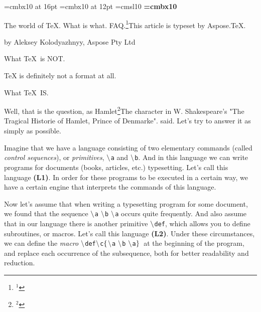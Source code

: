 \parskip=0pt
\def\afterpar{\vskip 15pt}
\def\beforepar{\vskip 5pt}
\font\bfsxt=cmbx10 at 16pt
\font\bftw=cmbx10 at 12pt
\font\slten=cmsl10
\font\bf=cmbx10
\def\fn#1#2{\footnote{\rm$^{#1}$}{#2}}
\def\header#1#2{{\centerline{\bfsxt #1}\vskip 10pt\centerline{by \slten #2}}}
\def\section#1{\afterpar{\bftw #1}\beforepar}
\def\cs#1{{$\tt \backslash$\tt #1}}
\def\ref#1{{\bf (#1)}}
\def\leftcb{$\tt\{$}
\def\rightcb{$\tt\}$}

\header{The world of \TeX. What is what. FAQ.\fn{1}{\rm This article is typeset by Aspose.TeX.}}{Aleksey Kolodyazhnyy, Aspose Pty Ltd}

\vskip 10pt
\section{What \TeX\ is NOT.}

TeX is definitely not a format at all.

\section{What \TeX\ IS.}

Well, that is the question, as Hamlet\fn{2}{The character in W. Shakespeare's "The Tragical Historie of Hamlet, Prince of Denmarke".} said.
Let's try to answer it as simply as possible.

Imagine that we have a language consisting of two elementary commands (called {\it control sequences}), or {\it primitives}, \cs{a} and \cs{b}. And in this language we can write programs for documents (books, articles, etc.) typesetting. Let's call this language \ref{L1}. In order for these programs to be executed in a certain way, we have a certain engine that interprets the commands of this language.

Now let's assume that when writing a typesetting program for some document, we found that the sequence \cs{a} \cs{b} \cs{a} occurs quite frequently. And also assume that in our language there is another primitive \cs{def}, which allows you to define subroutines, or macros. Let's call this language \ref{L2}. Under these circumstances, we can define the {\it macro} \cs{def}\cs{c}\leftcb\cs{a} \cs{b} \cs{a}\rightcb\ at the beginning of the program, and replace each occurrence of the subsequence, both for better readability and reduction.

